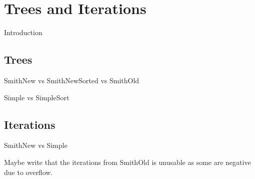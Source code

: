 \section{Trees and Iterations}
\label{sec:trees-iterations}

Introduction

\subsection{Trees}
\label{sec:trees}

SmithNew vs SmithNewSorted vs SmithOld

Simple vs SimpleSort

\subsection{Iterations}
\label{sec:iterations}

SmithNew vs Simple

Maybe write that the iterations from SmithOld is unusable as some are negative
due to overflow.

